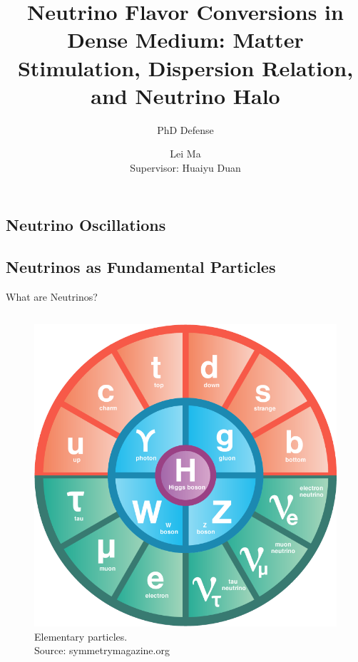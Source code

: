 \documentclass[9pt]{beamer}
\title{Neutrino Flavor Conversions in Dense Medium: Matter Stimulation, Dispersion Relation, and Neutrino Halo} %
\author{Lei Ma\\ Supervisor: Huaiyu Duan}
\subtitle{PhD Defense} %
\begin{document}
  \frame{\maketitle}


  \begin{darkframes}


    \section{Neutrino Oscillations}

    \subsection{Neutrinos as Fundamental Particles}

    \begin{frame}{What are Neutrinos?}
      \begin{minipage}[\textheight]{\textwidth}
      \begin{columns}[T]

      \begin{column}{0.6\textwidth}
      \begin{figure}
      \includegraphics[width=0.9\linewidth,height=0.8\textheight,keepaspectratio]{assets/standard-model}
      \caption*{Elementary particles. \\ Source: symmetrymagazine.org} %
      \end{figure}
      \end{column}


\end{columns}
\end{minipage}
\end{frame}
\end{darkframes}
\end{document}

